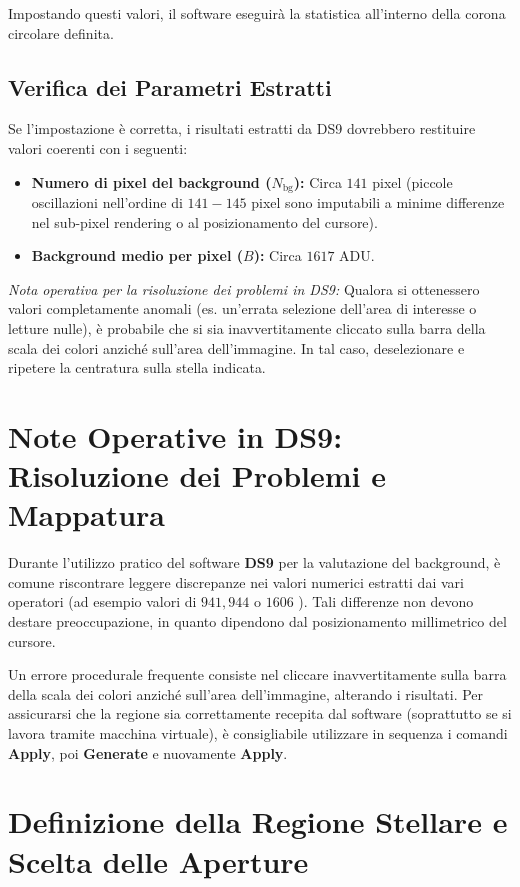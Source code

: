 Impostando questi valori, il software eseguirà la statistica all'interno della corona circolare definita.

\subsection{Verifica dei Parametri Estratti}
Se l'impostazione è corretta, i risultati estratti da DS9 dovrebbero restituire valori coerenti con i seguenti:
\begin{itemize}
\item \textbf{Numero di pixel del background ($N_{\text{bg}}$):} Circa $141$ pixel (piccole oscillazioni nell'ordine di $141-145$ pixel sono imputabili a minime differenze nel sub-pixel rendering o al posizionamento del cursore).
\item \textbf{Background medio per pixel ($B$):} Circa $1617$ ADU.
\end{itemize}

\textit{Nota operativa per la risoluzione dei problemi in DS9:} Qualora si ottenessero valori completamente anomali (es. un'errata selezione dell'area di interesse o letture nulle), è probabile che si sia inavvertitamente cliccato sulla barra della scala dei colori anziché sull'area dell'immagine. In tal caso, deselezionare e ripetere la centratura sulla stella indicata.

\section{Note Operative in DS9: Risoluzione dei Problemi e Mappatura}

Durante l'utilizzo pratico del software \textbf{DS9} per la valutazione del background, è comune riscontrare leggere discrepanze nei valori numerici estratti dai vari operatori (ad esempio valori di $941, 944$ o $1606$ ). Tali differenze non devono destare preoccupazione, in quanto dipendono dal posizionamento millimetrico del cursore.

Un errore procedurale frequente consiste nel cliccare inavvertitamente sulla barra della scala dei colori anziché sull'area dell'immagine, alterando i risultati. Per assicurarsi che la regione sia correttamente recepita dal software (soprattutto se si lavora tramite macchina virtuale), è consigliabile utilizzare in sequenza i comandi \textbf{Apply}, poi \textbf{Generate} e nuovamente \textbf{Apply}.

\section{Definizione della Regione Stellare e Scelta delle Aperture}

